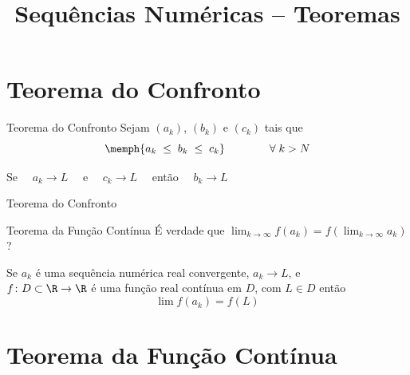 
\usepackage{integracao_e_series}

\title{Sequências Numéricas -- Teoremas}



\addtitle

\section{Teorema do Confronto}

\begin{frame}{Teorema do Confronto}
  Sejam $(a_k)$, $(b_k)$ e $(c_k)$ tais que
  \[
   	\memph{a_k \;\leq\; b_k \;\leq\; c_k} \qquad\qquad \forall\; k > N
 	\]

	\pause
  \vspace{\baselineskip}
  Se $\quad a_k\to L\quad$ e $\quad c_k\to L\quad$ então $\quad b_k\to L$
\end{frame}


\begin{frame}{Teorema do Confronto}
  \centering
  \scalebox{1}{}
\end{frame}

\begin{frame}{Teorema da Função Contínua}
É verdade que \quad
\emph{\(
  \lim_{k\to \infty} f(a_k) = f\!\left(\lim_{k\to \infty} a_k\right)
\)} \quad?

\pause
\vspace{2\baselineskip}
Se $a_k$ é uma sequência numérica real convergente, $a_k\to L$, e\\[1mm]
$f\colon D\subset\R\to\R$ é uma função real contínua em $D$,
com $L\in D$
então
\[
  \lim f(a_k) = f(L)
\]
\end{frame}

\section{Teorema da Função Contínua}

